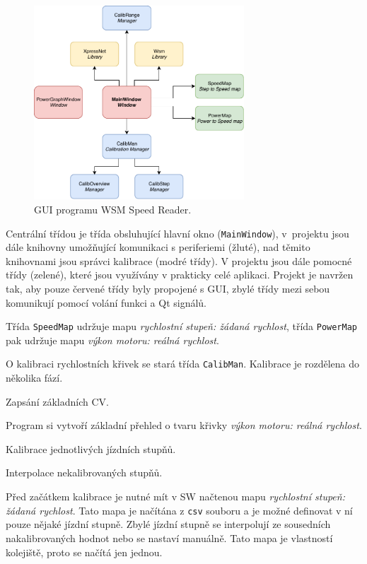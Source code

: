 \begin{figure}[h]
\includegraphics[width=0.7\textwidth]{data/ac_classes.pdf}
\caption{GUI programu WSM Speed Reader.}
\label{fig:ac-classes}
\end{figure}

Centrální třídou je třída obsluhující hlavní okno (\texttt{MainWindow}),
v~projektu jsou dále knihovny umožňující komunikaci s periferiemi (žluté),
nad těmito knihovnami jsou správci kalibrace (modré třídy). V projektu jsou
dále pomocné třídy (zelené), které jsou využívány v prakticky celé aplikaci.
Projekt je navržen tak, aby pouze červené třídy byly propojené s GUI, zbylé
třídy mezi sebou komunikují pomocí volání funkci a Qt signálů.

Třída \texttt{SpeedMap} udržuje mapu \textit{rychlostní stupeň: žádaná rychlost},
třída \texttt{PowerMap} pak udržuje mapu \textit{výkon motoru: reálná rychlost}.

O kalibraci rychlostních křivek se stará třída \texttt{CalibMan}. Kalibrace
je rozdělena do několika fází.

\begin{compactenum}
\item Zapsání základních CV.
\item Program si vytvoří základní přehled o tvaru křivky \textit{výkon motoru:
      reálná rychlost}.
\item Kalibrace jednotlivých jízdních stupňů.
\item Interpolace nekalibrovaných stupňů.
\end{compactenum}

Před začátkem kalibrace je nutné mít v SW načtenou mapu \textit{rychlostní
stupeň: žádaná rychlost}. Tato mapa je načítána z \texttt{csv} souboru a je
možné definovat v ní pouze nějaké jízdní stupně. Zbylé jízdní stupně se
interpolují ze sousedních nakalibrovaných hodnot nebo se nastaví manuálně.
Tato mapa je vlastností kolejiště, proto se načítá jen jednou.

